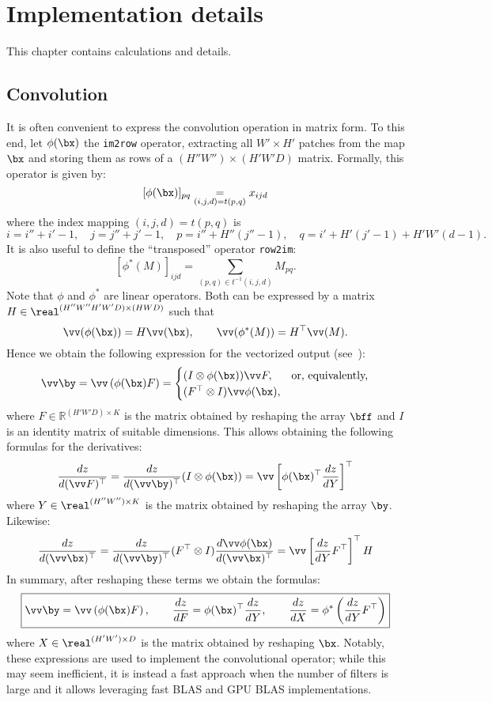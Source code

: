 \chapter{Implementation details}\label{s:impl}

This chapter contains calculations and details.

\section{Convolution}\label{s:impl-convolution}

It is often convenient to express the convolution operation in matrix form. To this end, let $\phi(\bx)$ the \verb!im2row! operator, extracting all $W' \times H'$ patches from the map $\bx$ and storing them as rows of a $(H''W'') \times (H'W'D)$ matrix. Formally, this operator is given by:
\[
   [\phi(\bx)]_{pq} \underset{(i,j,d)=t(p,q)}{=} x_{ijd}
\]
where the index mapping $(i,j,d) = t(p,q)$ is
\[
 i = i''+i'-1, \quad
 j = j''+j'-1, \quad
 p = i'' + H'' (j''-1), \quad
 q = i' + H'(j'-1) + H'W' (d-1).
\]
It is also useful to define the ``transposed'' operator \verb!row2im!:
\[
   [\phi^*(M)]_{ijd}
   =
   \sum_{(p,q) \in t^{-1}(i,j,d)}
   M_{pq}.
\]
Note that $\phi$ and $\phi^*$ are linear operators. Both can be expressed by a matrix $H\in\real^{(H''W''H'W'D) \times(HWD)}$ such that
\[
  \vv(\phi(\bx)) = H \vv(\bx), \qquad 
  \vv(\phi^*(M)) = H^\top \vv(M).
\]
Hence we obtain the following expression for the vectorized output (see~\cite{kinghorn96integrals}):
\[
 \vv\by = 
 \vv\left(\phi(\bx) F\right)
 =
 \begin{cases}
 (I \otimes \phi(\bx)) \vv F, & \text{or, equivalently,} \\
 (F^\top \otimes I) \vv \phi(\bx),
 \end{cases}
\]
where $F\in\mathbb{R}^{(H'W'D)\times K}$ is the matrix obtained by reshaping the array $\bff$ and $I$ is an identity matrix of suitable dimensions. This allows obtaining the following formulas for the derivatives:
\[
\frac{dz}{d(\vv F)^\top}
=
\frac{dz}{d(\vv\by)^\top}
(I \otimes \phi(\bx))
= \vv\left[ 
\phi(\bx)^\top 
\frac{dz}{dY}
\right]^\top
\]
where $Y\in\real^{(H''W'')\times K}$ is the matrix obtained by reshaping the array $\by$. Likewise:
\[
\frac{dz}{d(\vv \bx)^\top}
=
\frac{dz}{d(\vv\by)^\top}
(F^\top \otimes I)
\frac{d\vv \phi(\bx)}{d(\vv \bx)^\top}
=
\vv\left[ 
\frac{dz}{dY}
F^\top
\right]^\top
H
\]
In summary, after reshaping these terms we obtain the formulas:
\[
\boxed{
\vv\by = 
 \vv\left(\phi(\bx) F\right),
\qquad
\frac{dz}{dF}
=
\phi(\bx)^\top\frac{d z}{d Y},
\qquad
\frac{d z}{d X}
=
\phi^*\left(
\frac{d z}{d Y}F^\top
\right)
}
\]
where $X\in\real^{(H'W')\times D}$ is the matrix obtained by reshaping $\bx$. Notably, these expressions are used to implement the convolutional operator; while this may seem inefficient, it is instead a fast approach when the number of filters is large and it allows leveraging fast BLAS and GPU BLAS implementations.

